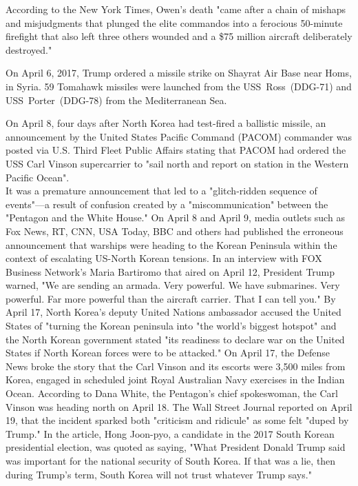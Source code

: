 According to the New York Times, Owen's death "came after a chain of
mishaps and misjudgments that plunged the elite commandos into a
ferocious 50-minute firefight that also left three others wounded and a
\$75 million aircraft deliberately destroyed."

On April 6, 2017, Trump ordered a missile strike on Shayrat Air Base
near Homs, in Syria. 59 Tomahawk missiles were launched from the
USS~Ross~(DDG-71) and USS~Porter~(DDG-78) from the Mediterranean Sea.

On April 8, four days after North Korea had test-fired a ballistic
missile, an announcement by the United States Pacific Command (PACOM)
commander was posted via U.S. Third Fleet Public Affairs stating that
PACOM had ordered the USS Carl Vinson supercarrier to "sail north and
report on station in the Western Pacific Ocean".\\
It was a premature announcement that led to a "glitch-ridden sequence of
events"---a result of confusion created by a "miscommunication" between
the "Pentagon and the White House." On April 8 and April 9, media
outlets such as Fox News, RT, CNN, USA Today, BBC and others had
published the erroneous announcement that warships were heading to the
Korean Peninsula within the context of escalating US-North Korean
tensions. In an interview with FOX Business Network's Maria Bartiromo
that aired on April 12, President Trump warned, "We are sending an
armada. Very powerful. We have submarines. Very powerful. Far more
powerful than the aircraft carrier. That I can tell you." By April 17,
North Korea's deputy United Nations ambassador accused the United States
of "turning the Korean peninsula into "the world's biggest hotspot" and
the North Korean government stated "its readiness to declare war on the
United States if North Korean forces were to be attacked." On April 17,
the Defense News broke the story that the Carl Vinson and its escorts
were 3,500 miles from Korea, engaged in scheduled joint Royal Australian
Navy exercises in the Indian Ocean. According to Dana White, the
Pentagon's chief spokeswoman, the Carl Vinson was heading north on April
18. The Wall Street Journal reported on April 19, that the incident
sparked both "criticism and ridicule" as some felt "duped by Trump." In
the article, Hong Joon-pyo, a candidate in the 2017 South Korean
presidential election, was quoted as saying, "What President Donald
Trump said was important for the national security of South Korea. If
that was a lie, then during Trump's term, South Korea will not trust
whatever Trump says."

